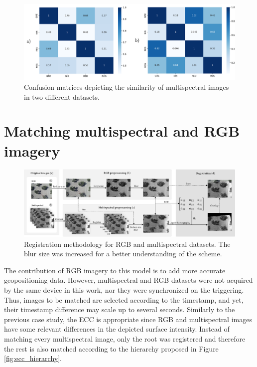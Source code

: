 \begin{figure}
    \centering
    \includegraphics{figs/image_fusion/confusion_matrices.png}
    \caption{Confusion matrices depicting the similarity of multispectral images in two different datasets.}
    \label{fig:multi_band_correlation}
\end{figure}

\section{Matching multispectral and RGB imagery}

\begin{figure}
    \centering
    \includegraphics{figs/image_fusion/multispectral_rgb_registration.png}
    \caption{Registration methodology for RGB and multispectral datasets. The blur size was increased for a better understanding of the scheme.}
    \label{fig:rgb_multi_registration}
\end{figure}

The contribution of RGB imagery to this model is to add more accurate geopositioning data. However, multispectral and RGB datasets were not acquired by the same device in this work, nor they were synchronized on the triggering. Thus, images to be matched are selected according to the timestamp, and yet, their timestamp difference may scale up to several seconds. Similarly to the previous case study, the ECC is appropriate since RGB and multispectral images have some relevant differences in the depicted surface intensity. Instead of matching every multispectral image, only the root was registered and therefore the rest is also matched according to the hierarchy proposed in Figure \ref{fig:ecc_hierarchy}.

